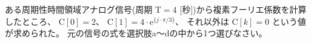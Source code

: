 ある周期性時間領域アナログ信号(周期 $\textrm{T} = 4$ [秒])から複素フーリエ係数を計算したところ、
$\textrm{C}[0] = 2$、
$\textrm{C}[1] = 4 \cdot \textrm{e}^{\{ j \cdot \pi/3 \}}$、
それ以外は $\textrm{C}[k] = 0$ という値が求められた。
元の信号の式を選択肢a〜dの中から1つ選びなさい。
